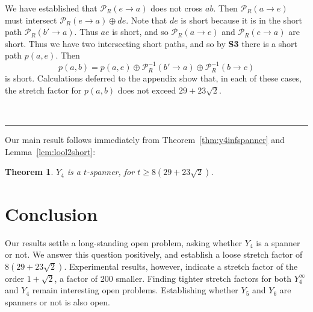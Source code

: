 \pdfoutput=1  \documentclass[11pt]{article}
\newtheorem{theorem}{Theorem}
\newcommand{\qed}{\rule{0.5em}{1.5ex}}
\newcommand{\fqed}{{\hfill~\qed}}
\newenvironment{proof}{{\noindent \bf Proof.}}
                      {{\hfill \fqed} \vspace{1em}}
\newcommand{\Pa}{{\mathcal P}}
\begin{document}
\begin{proof}
We have established that $\Pa_R(e \rightarrow a)$ does not cross $ab$. Then
$\Pa_R(a \rightarrow e)$ must intersect $\Pa_R(e \rightarrow a) \oplus de$.
Note that $de$ is short because it is in the short path $\Pa_R(b' \rightarrow a)$.
Thus $ae$ is short, and so $\Pa_R(a \rightarrow e)$ and $\Pa_R(e \rightarrow a)$
are short.
Thus we have two intersecting short paths, and so by {\bf S3}
there is a short path $p(a,e)$.
Then
$$
p(a,b) = p(a,e) \oplus \Pa_R^{-1}(b' \rightarrow a) \oplus  \Pa_R^{-1}(b \rightarrow c)
$$
is short. Calculations deferred to the appendix show that, in each of these cases, the
stretch factor for $p(a,b)$ does not exceed $29+23\sqrt{2}$.
\end{proof}

\noindent
Our main result follows immediately from Theorem~\ref{thm:y4infspanner} and Lemma~\ref{lem:lool2short}:

\begin{theorem}
$Y_4$ is a $t$-spanner, for $t \ge 8(29+23\sqrt{2})$.
\end{theorem}

\section{Conclusion}
Our results settle a long-standing open problem, asking whether $Y_4$
is a spanner or not. We answer this question positively, and
establish a loose stretch factor of $8(29+23\sqrt{2})$.
Experimental results, however, indicate a stretch factor of the
order $1 + \sqrt{2}$, a factor of 200 smaller.
Finding tighter stretch factors for both $Y_4^\infty$ and $Y_4$
remain interesting open problems. Establishing
whether $Y_5$ and $Y_6$ are spanners or not is also open. 

\noindent
\end{document}
